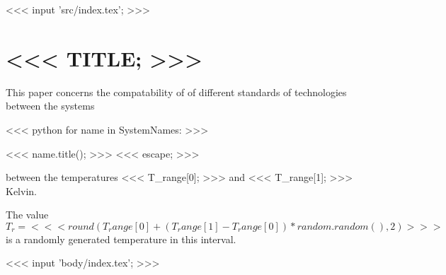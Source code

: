 <<< input 'src/index.tex'; >>>




    \section{<<< TITLE; >>>}
    \author{<<< AUTHOR; >>>}

    This paper concerns the compatability of
    of different standards of technologies between the systems

    \begin{itemise}
    <<< python
    for name in SystemNames:
    >>>
    \item <<< name.title(); >>>
    <<< escape; >>>
    \end{itemise}

    between the temperatures <<< T_range[0]; >>> and <<< T_range[1]; >>> Kelvin.

    The value $T_{r}=<<<
        round(T_range[0] + (T_range[1] - T_range[0])*random.random(), 2)
    >>>$ is a randomly generated temperature in this interval.

    <<< input 'body/index.tex'; >>>

